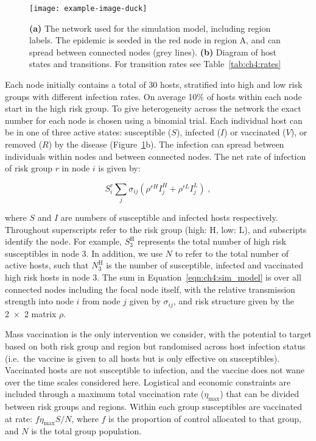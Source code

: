 \begin{figure}[htb]
    \begin{center}
        \texttt{[image: example-image-duck]}%
        \caption{\textbf{(a)} The network used for the simulation model, including region labels. The epidemic is seeded in the red node in region A, and can spread between connected nodes (grey lines). \textbf{(b)} Diagram of host states and transitions. For transition rates see Table~\ref{tab:ch4:rates}}
        \label{fig:ch4:node_structure_and_model}
    \end{center}
\end{figure}

Each node initially contains a total of 30 hosts, stratified into high and low risk groups with different infection rates. On average 10\% of hosts within each node start in the high risk group. To give heterogeneity across the network the exact number for each node is chosen using a binomial trial. Each individual host can be in one of three active states: susceptible ($S$), infected ($I$) or vaccinated ($V$), or removed ($R$) by the disease (Figure~\ref{fig:ch4:node_structure_and_model}b). The infection can spread between individuals within nodes and between connected nodes. The net rate of infection of risk group $r$ in node $i$ is given by:
\begin{linenomath*}
    \begin{equation}
        S_i^r \sum_j \sigma_{ij} \left(\rho^{rH}I_j^H + \rho^{rL}I_j^L\right)\;,
    \label{eqn:ch4:sim_model}
    \end{equation}
\end{linenomath*}
where $S$ and $I$ are numbers of susceptible and infected hosts respectively. Throughout superscripts refer to the risk group (high: H, low: L), and subscripts identify the node. For example, $S_{3}^\mathrm{H}$ represents the total number of high risk susceptibles in node 3. In addition, we use $N$ to refer to the total number of active hosts, such that $N_{3}^\mathrm{H}$ is the number of susceptible, infected and vaccinated high risk hosts in node 3. The sum in Equation~\ref{eqn:ch4:sim_model} is over all connected nodes including the focal node itself, with the relative transmission strength into node $i$ from node $j$ given by $\sigma_{ij}$, and risk structure given by the \num{2x2} matrix $\rho$.

Mass vaccination is the only intervention we consider, with the potential to target based on both risk group and region but randomised across host infection status (i.e.\ the vaccine is given to all hosts but is only effective on susceptibles). Vaccinated hosts are not susceptible to infection, and the vaccine does not wane over the time scales considered here. Logistical and economic constraints are included through a maximum total vaccination rate ($\eta_{\mathrm{max}}$) that can be divided between risk groups and regions. Within each group susceptibles are vaccinated at rate: $f\eta_{\mathrm{max}}S/N$, where $f$ is the proportion of control allocated to that group, and $N$ is the total group population.

